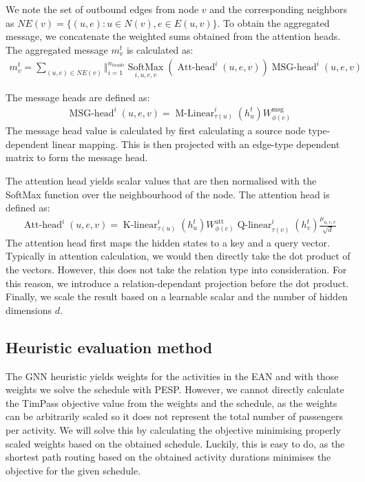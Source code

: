 \documentclass[english, 12pt, a4paper, sci, utf8, a-2b, online]{aaltothesis}
\begin{document}
We note the set of outbound edges from node $v$ and the corresponding neighbors as $NE(v) = \{(u, e) : u \in N(v), e \in E(u, v)\}$. To obtain the aggregated message, we concatenate the weighted sums obtained from the attention heads. The aggregated message $m_v^t$ is calculated as:
\begin{align*}
    m_v^t = \sum_{(u, e) \in \mathit{NE}(v)} \operatorname{\Big\Vert}_{i = 1}^{n_{\mathit{heads}}} \underset{i, u, e, v}{\operatorname{SoftMax}}(\operatorname{Att-head}^i(u, e, v))\operatorname{MSG-head}^i(u, e, v)
\end{align*}  %

The message heads are defined as:
\begin{align*}
    \operatorname{MSG-head}^i(u, e, v) = \operatorname{M-Linear}^i_{\tau(u)}(h^{t}_u)W^{\text{msg}}_{\phi(e)}
\end{align*}
The message head value is calculated by first calculating a source node type-dependent linear mapping. This is then projected with an edge-type dependent matrix to form the message head.

The attention head yields scalar values that are then normalised with the SoftMax function over the neighbourhood of the node. The attention head is defined as:
\begin{align*}
    \operatorname{Att-head}^i(u, e, v) = \operatorname{K-linear}^i_{\tau(u)}(h^t_u)W^\text{att}_{\phi(e)}\operatorname{Q-linear}^i_{\tau(v)}(h^t_v)\frac{\mu_{u, e, v}}{\sqrt{d}}
\end{align*}
The attention head first maps the hidden states to a key and a query vector. Typically in attention calculation, we would then directly take the dot product of the vectors. However, this does not take the relation type into consideration. For this reason, we introduce a relation-dependant projection before the dot product. Finally, we scale the result based on a learnable scalar and the number of hidden dimensions $d$.


\subsection{Heuristic evaluation method}
\label{sec:heur-eval}


The GNN heuristic yields weights for the activities in the EAN and with those weights we solve the schedule with PESP. However, we cannot directly calculate the TimPass objective value from the weights and the schedule, as the weights can be arbitrarily scaled so it does not represent the total number of passengers per activity. We will solve this by calculating the objective minimising properly scaled weights based on the obtained schedule. Luckily, this is easy to do, as the shortest path routing based on the obtained activity durations minimises the objective for the given schedule.
\end{document}
